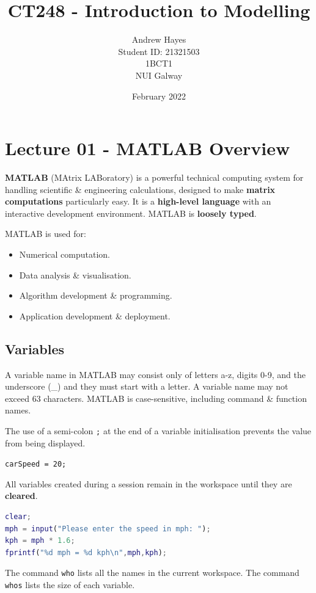 \documentclass[11pt]{article}
\title{CT248 - Introduction to Modelling}
\author{Andrew Hayes\\
\AND
Student ID: 21321503\\
\AND
\AND
\AND
\AND
	1BCT1\\
\AND
	NUI Galway\\
}
\date{February 2022}
\begin{document}
\maketitle

\newpage
\tableofcontents
\thispagestyle{empty}


\newpage
\setcounter{page}{1}
\section{Lecture 01 - MATLAB Overview}
\textbf{MATLAB} (MAtrix LABoratory) is a powerful technical computing system for handling scientific \& engineering 
calculations, designed to make \textbf{matrix computations} particularly easy. 
It is a \textbf{high-level language} with an interactive development environment.
MATLAB is \textbf{loosely typed}.

MATLAB is used for:
\begin{itemize}
    \item Numerical computation. 
    \item Data analysis \& visualisation. 
    \item Algorithm development \& programming. 
    \item Application development \& deployment.
\end{itemize}

\subsection{Variables}
A variable name in MATLAB may consist only of letters a-z, digits 0-9, and the underscore (\_) and they must start
with a letter. 
A variable name may not exceed 63 characters. 
MATLAB is case-sensitive, including command \& function names. 

The use of a semi-colon \verb|;| at the end of a variable initialisation prevents the value from being displayed. 

\verb|carSpeed = 20;|

All variables created during a session remain in the workspace until they are \textbf{cleared}. 
\begin{lstlisting}[language=MATLAB]
clear;
mph = input("Please enter the speed in mph: ");
kph = mph * 1.6;
fprintf("%d mph = %d kph\n",mph,kph);
\end{lstlisting}

The command \verb|who| lists all the names in the current workspace. 
The command \verb|whos| lists the size of each variable. 
\end{document}
